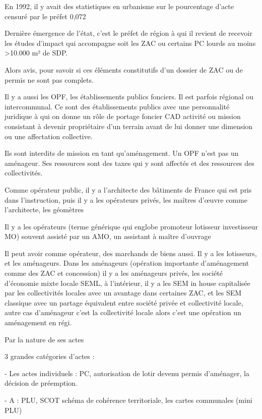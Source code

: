 		En 1992, il y avait des statistiques en urbanisme sur le pourcentage d’acte censuré par le préfet 0,072%

		Dernière émergence de l’état, c’est le préfet de région à qui il revient de recevoir les études d’impact qui accompagne soit les ZAC ou certains PC lourds au moins >10.000 m² de SDP.

		Alors avis, pour savoir si ces éléments constitutifs d’un dossier de ZAC ou de permis ne sont pas complets.

		Il y a aussi les OPF, les établissements publics fonciers. Il est parfois régional ou intercommunal. Ce sont des établissements publics avec une personnalité juridique à qui on donne un rôle de portage foncier CAD activité ou mission consistant à devenir propriétaire d’un terrain avant de lui donner une dimension ou une affectation collective.

		Ils sont interdits de mission en tant qu’aménagement. Un OPF n’est pas un aménageur. Ses ressources sont des taxes qui y sont affectés et des ressources des collectivités.

		Comme opérateur public, il y a l’architecte des bâtiments de France qui est pris dans l’instruction, puis il y a les opérateurs privés, les maîtres d’œuvre comme l’architecte, les géomètres

		Il y a les opérateurs (terme générique qui englobe promoteur lotisseur investisseur MO) souvent assisté par un AMO, un assistant à maître d’ouvrage

		Il peut avoir comme opérateur, des marchands de biens aussi. Il y a les lotisseurs, et les aménageurs. Dans les aménageurs (opération importante d’aménagement comme des ZAC et concession) il y a les aménageurs privés, les société d’économie mixte locale SEML, à l’intérieur, il y a les SEM in house capitalisée par les collectivités locales avec un avantage dans certaines ZAC, et les SEM classique avec un partage équivalent entre société privée et collectivité locale, autre cas d’aménageur c’est la collectivité locale alors c’est une opération un aménagement en régi.






		Par la nature de ses actes

		3 grandes catégories d’actes :

		-	Les actes individuels : PC, autorisation de lotir devenu permis d’aménager, la décision de préemption.

		-	A : PLU, SCOT schéma de cohérence territoriale, les cartes communales (mini PLU)

